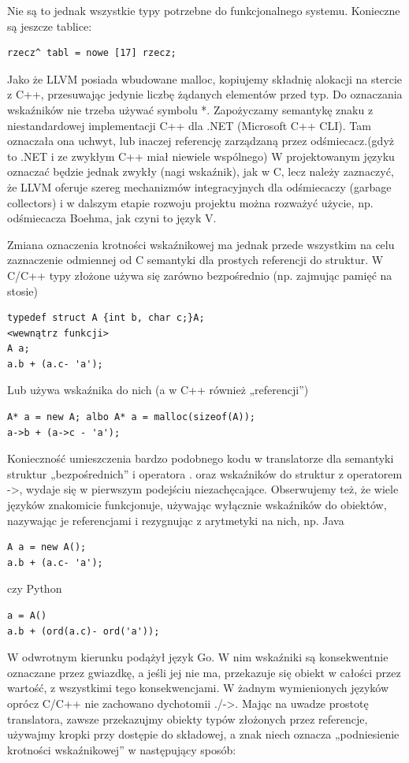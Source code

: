 Nie są to jednak wszystkie typy potrzebne do funkcjonalnego systemu. Konieczne są jeszcze tablice:
\begin{lstlisting}
rzecz^ tabl = nowe [17] rzecz;
\end{lstlisting}
Jako że LLVM posiada wbudowane malloc, kopiujemy składnię alokacji na stercie z C++, przesuwając jedynie liczbę żądanych elementów przed typ.
Do oznaczania wskaźników nie trzeba używać symbolu *. Zapożyczamy semantykę znaku \up\space z niestandardowej implementacji C++ dla .NET (Microsoft C++ CLI). Tam oznaczała ona uchwyt, lub inaczej referencję zarządzaną przez odśmiecacz.(gdyż to .NET i ze zwykłym C++ miał niewiele wspólnego) W projektowanym języku oznaczać będzie jednak \up \space zwykły (nagi wskaźnik), jak w C, lecz należy zaznaczyć, że LLVM oferuje szereg mechanizmów integracyjnych dla odśmiecaczy (garbage collectors) i w dalszym etapie rozwoju projektu można rozważyć użycie, np. odśmiecacza Boehma, jak czyni to język V\cite{vlang_repo}.

Zmiana oznaczenia krotności wskaźnikowej ma jednak przede wszystkim na celu zaznaczenie odmiennej od C semantyki dla prostych referencji do struktur. W C/C++ typy złożone używa się zarówno bezpośrednio (np. zajmując pamięć na stosie)
\begin{lstlisting}
typedef struct A {int b, char c;}A;
<wewnątrz funkcji>
A a;
a.b + (a.c- 'a');
\end{lstlisting}
Lub używa wskaźnika do nich (a w C++ również „referencji”)
\begin{lstlisting}
A* a = new A; albo A* a = malloc(sizeof(A));
a->b + (a->c - 'a');
\end{lstlisting}
Konieczność umieszczenia bardzo podobnego kodu w translatorze dla semantyki struktur „bezpośrednich” i operatora . oraz wskaźników do struktur z operatorem ->, wydaje się w pierwszym podejściu niezachęcające. Obserwujemy też, że wiele języków znakomicie funkcjonuje, używając wyłącznie wskaźników do obiektów, nazywając je referencjami i rezygnując z arytmetyki na nich, np. Java
\begin{lstlisting}
A a = new A(); 
a.b + (a.c- 'a');
\end{lstlisting}
czy Python
\begin{lstlisting}
a = A() 
a.b + (ord(a.c)- ord('a'));
\end{lstlisting}
W odwrotnym kierunku podążył język Go. W nim wskaźniki są konsekwentnie oznaczane przez gwiazdkę, a jeśli jej nie ma, przekazuje się obiekt w całości przez wartość, z wszystkimi tego konsekwencjami.
W żadnym wymienionych języków oprócz C/C++ nie zachowano dychotomii ./->.
Mając na uwadze prostotę translatora, zawsze przekazujmy obiekty typów złożonych przez referencje, używajmy kropki przy dostępie do składowej, a znak \up\space niech oznacza „podniesienie krotności wskaźnikowej” w następujący sposób:

